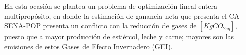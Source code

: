 En esta ocasión se plantea un problema de optimización lineal entera multipropósito, en donde la estimación de ganancia neta que presenta el CA-SENA-POP presenta un conflicto con la reducción de gases de $[KgCO_{2eq}]$, puesto que a mayor producción de estiércol, leche y carne; mayores son las emisiones de estos Gases de Efecto Invernadero (GEI).

